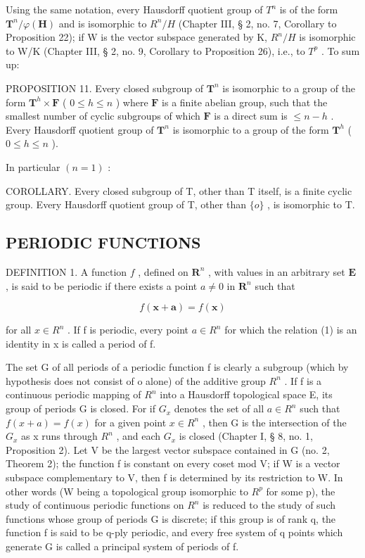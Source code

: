 Using the same notation, every Hausdorff quotient group of \(T^{n}\) is of the form \(\mathbf{T}^{n}/\varphi(\mathbf{H})\) and is isomorphic to \(R^{n}/H\) (Chapter III, § 2, no. 7, Corollary to Proposition 22); if W is the vector subspace generated by K, \(R^{n}/H\) is isomorphic to W/K (Chapter III, § 2, no. 9, Corollary to Proposition 26), i.e., to \(T^{p}\) . To sum up:

PROPOSITION 11. Every closed subgroup of \(\mathbf{T}^n\) is isomorphic to a group of the form \(\mathbf{T}^h \times \mathbf{F}\) ( \(0 \leqslant h \leqslant n\) ) where \(\mathbf{F}\) is a finite abelian group, such that the smallest number of cyclic subgroups of which \(\mathbf{F}\) is a direct sum is \(\leqslant n - h\) . Every Hausdorff quotient group of \(\mathbf{T}^n\) is isomorphic to a group of the form \(\mathbf{T}^h\) ( \(0 \leqslant h \leqslant n\) ).

In particular \((n = 1)\) :

COROLLARY. Every closed subgroup of T, other than T itself, is a finite cyclic group. Every Hausdorff quotient group of T, other than \(\{o\}\) , is isomorphic to T.

\subsection{PERIODIC FUNCTIONS}

DEFINITION 1. A function \(f\) , defined on \(\mathbf{R}^n\) , with values in an arbitrary set \(\mathbf{E}\) , is said to be periodic if there exists a point \(a \neq 0\) in \(\mathbf{R}^n\) such that

\[
f (\boldsymbol {x} + \boldsymbol {a}) = f (\boldsymbol {x})\tag{1}
\]

for all \(x \in R^{n}\) . If f is periodic, every point \(a \in R^{n}\) for which the relation (1) is an identity in x is called a period of f.

The set G of all periods of a periodic function f is clearly a subgroup (which by hypothesis does not consist of o alone) of the additive group \(R^{n}\) . If f is a continuous periodic mapping of \(R^{n}\) into a Hausdorff topological space E, its group of periods G is closed. For if \(G_{x}\) denotes the set of all \(a \in R^{n}\) such that \(f(x + a) = f(x)\) for a given point \(x \in R^{n}\) , then G is the intersection of the \(G_{x}\) as x runs through \(R^{n}\) , and each \(G_{x}\) is closed (Chapter I, § 8, no. 1, Proposition 2). Let V be the largest vector subspace contained in G (no. 2, Theorem 2); the function f is constant on every coset mod V; if W is a vector subspace complementary to V, then f is determined by its restriction to W. In other words (W being a topological group isomorphic to \(R^{p}\) for some p), the study of continuous periodic functions on \(R^{n}\) is reduced to the study of such functions whose group of periods G is discrete; if this group is of rank q, the function f is said to be q-ply periodic, and every free system of q points which generate G is called a principal system of periods of f.

